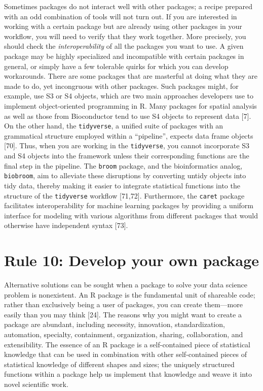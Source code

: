 \documentclass[10pt,letterpaper]{article}
\begin{document}
Sometimes packages do not interact well with other packages; a recipe
prepared with an odd combination of tools will not turn out. If you are
interested in working with a certain package but are already using other
packages in your workflow, you will need to verify that they work
together. More precisely, you should check the \emph{interoperability}
of all the packages you want to use. A given package may be highly
specialized and incompatible with certain packages in general, or simply
have a few tolerable quirks for which you can develop workarounds. There
are some packages that are masterful at doing what they are made to do,
yet incongruous with other packages. Such packages might, for example,
use S3 or S4 objects, which are two main approaches developers use to
implement object-oriented programming in R. Many packages for spatial
analysis as well as those from Bioconductor tend to use S4 objects to
represent data {[}7{]}. On the other hand, the \texttt{tidyverse}, a
unified suite of packages with an grammatical structure employed within
a ``pipeline'', expects data frame objects {[}70{]}. Thus, when you are
working in the \texttt{tidyverse}, you cannot incorporate S3 and S4
objects into the framework unless their corresponding functions are the
final step in the pipeline. The \texttt{broom} package, and the
bioinformatics analog, \texttt{biobroom}, aim to alleviate these
disruptions by converting untidy objects into tidy data, thereby making
it easier to integrate statistical functions into the structure of the
\texttt{tidyverse} workflow {[}71,72{]}. Furthermore, the \texttt{caret}
package facilitates interoperability for machine learning packages by
providing a uniform interface for modeling with various algorithms from
different packages that would otherwise have independent syntax
{[}73{]}.

\hypertarget{rule-10-develop-your-own-package}{%
\section{Rule 10: Develop your own
package}\label{rule-10-develop-your-own-package}}

Alternative solutions can be sought when a package to solve your data
science problem is nonexistent. An R package is the fundamental unit of
shareable code; rather than exclusively being a user of packages, you
can create them---more easily than you may think {[}24{]}. The reasons
why you might want to create a package are abundant, including
necessity, innovation, standardization, automation, specialty,
containment, organization, sharing, collaboration, and extensibility.
The essence of an R package is a self-contained piece of statistical
knowledge that can be used in combination with other self-contained
pieces of statistical knowledge of different shapes and sizes; the
uniquely structured functions within a package help us implement that
knowledge and weave it into novel scientific work.
\end{document}
